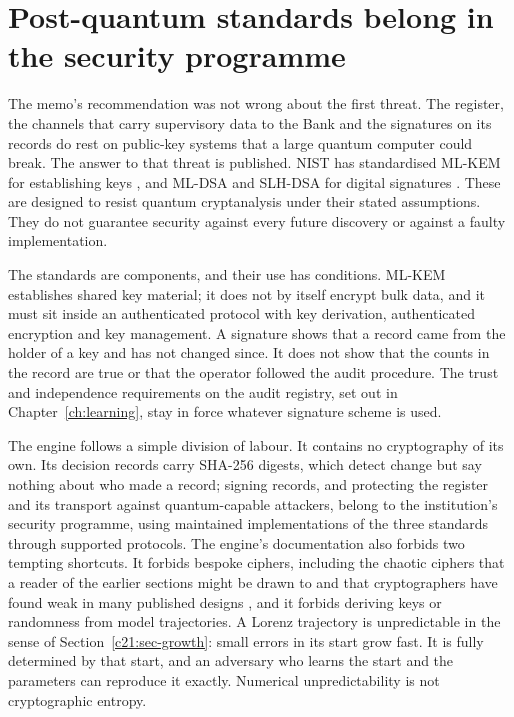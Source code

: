 \section{Post-quantum standards belong in the security programme}

The memo's recommendation was not wrong about the first threat. The register, the channels that
carry supervisory data to the Bank and the signatures on its records do rest on public-key systems
that a large quantum computer could break. The answer to that threat is published. NIST has
standardised ML-KEM for establishing keys \citep{nist2024a}, and ML-DSA and SLH-DSA for digital
signatures \citep{nist2024b,nist2024c}. These are designed to resist quantum cryptanalysis under
their stated assumptions. They do not guarantee security against every future discovery or against
a faulty implementation.

The standards are components, and their use has conditions. ML-KEM establishes shared key
material; it does not by itself encrypt bulk data, and it must sit inside an authenticated
protocol with key derivation, authenticated encryption and key management. A signature shows that a
record came from the holder of a key and has not changed since. It does not show that the counts in
the record are true or that the operator followed the audit procedure. The trust and independence
requirements on the audit registry, set out in Chapter~\ref{ch:learning}, stay in force whatever signature
scheme is used.

The engine follows a simple division of labour. It contains no cryptography of its own. Its
decision records carry SHA-256 digests, which detect change but say nothing about who made a
record; signing records, and protecting the register and its transport against quantum-capable
attackers, belong to the institution's security programme, using maintained implementations of the
three standards through supported protocols. The engine's documentation also forbids two tempting
shortcuts. It forbids bespoke ciphers, including the chaotic ciphers that a reader of the earlier
sections might be drawn to and that cryptographers have found weak in many published designs
\citep{alvarez2006}, and it forbids deriving keys or randomness from model trajectories. A Lorenz
trajectory is unpredictable in the sense of Section~\ref{c21:sec-growth}: small errors in its start grow fast. It
is fully determined by that start, and an adversary who learns the start and the parameters can
reproduce it exactly. Numerical unpredictability is not cryptographic entropy.

